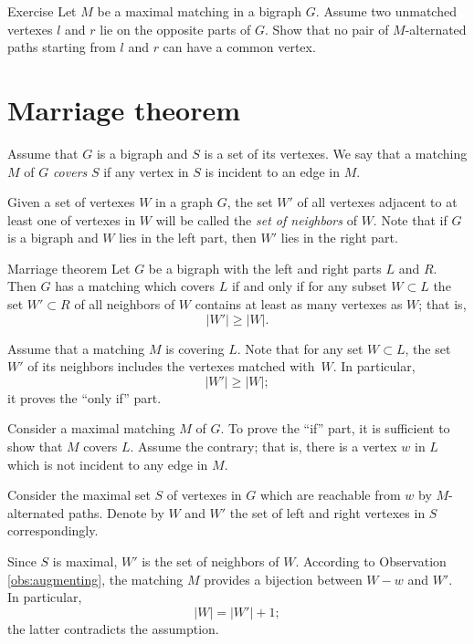 \begin{thm}{Exercise}\label{ex:two-paths}
Let $M$ be a maximal matching in a bigraph $G$.
Assume two unmatched vertexes $l$ and $r$ lie on the opposite parts of $G$.
Show that no pair of $M$-alternated paths starting from $l$ and $r$ can have a common vertex.
\end{thm}

\section*{Marriage theorem}

Assume that $G$ is a bigraph and $S$ is a set of its vertexes.
We say that a matching $M$ of $G$ {}\emph{covers} $S$ if any vertex in $S$ is incident to an edge in $M$.

Given a set of vertexes $W$ in a graph $G$, the set $W'$ of all vertexes  adjacent to at least one of vertexes in $W$ will be called the \emph{set of neighbors} of $W$.
Note that if $G$ is a bigraph and $W$ lies in the left part, then $W'$ lies in the right part. 

\begin{thm}{Marriage theorem}
Let $G$ be a bigraph with the left and right parts $L$ and $R$.
Then $G$ has a matching which covers $L$ if and only if for any subset $W\subset L$ the set $W'\subset R$ of all neighbors of $W$ contains at least as many vertexes as $W$; that is, 
\[|W'|\ge |W|.\] 

\end{thm}

Assume that a matching $M$ is covering $L$.
Note that for any set  $W\subset L$, the set $W'$ of its neighbors includes the vertexes matched with~$W$.
In particular,
\[|W'|\ge |W|;\]
it proves the ``only if'' part.

Consider a maximal matching $M$ of $G$.
To prove the ``if'' part, it is sufficient to show that $M$ covers $L$.
Assume the contrary; that is, there is a vertex $w$ in $L$ which is not incident to any edge in $M$.

Consider the maximal set $S$ of vertexes in $G$ which are reachable from $w$ by 
$M$-alternated paths.
Denote by $W$ and $W'$ the set of left and right vertexes in $S$ correspondingly.

Since $S$ is maximal, $W'$ is the set of neighbors of $W$. 
According to Observation \ref{obs:augmenting}, the matching $M$ provides a bijection between $W-w$ and $W'$.
In particular, 
\[|W|=|W'|+1;\] 
the latter contradicts the assumption.
\qeds

